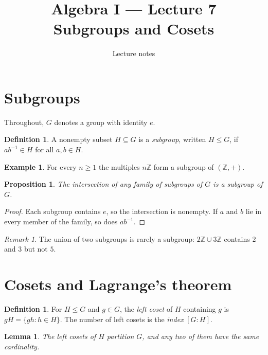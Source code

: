 \documentclass[11pt]{article}
\title{Algebra I --- Lecture 7\\ Subgroups and Cosets}
\author{Lecture notes}
\date{}
\newtheorem{lemma}[theorem]{Lemma}
\newtheorem{proposition}[theorem]{Proposition}
\theoremstyle{definition}
\newtheorem{definition}[theorem]{Definition}
\newtheorem{example}[theorem]{Example}
\theoremstyle{remark}
\newtheorem*{remark}{Remark}
\newcommand{\Z}{\mathbb{Z}}
\begin{document}
\maketitle

\section{Subgroups}

Throughout, $G$ denotes a group with identity $e$.

\begin{definition}
A nonempty subset $H \subseteq G$ is a \emph{subgroup}, written $H \le G$,
if $ab^{-1} \in H$ for all $a, b \in H$.
\end{definition}

\begin{example}
For every $n \ge 1$ the multiples $n\Z$ form a subgroup of $(\Z,+)$.
\end{example}

\begin{proposition}\label{prop:intersection}
The intersection of any family of subgroups of $G$ is a subgroup of $G$.
\end{proposition}

\begin{proof}
Each subgroup contains $e$, so the intersection is nonempty. If $a$ and $b$
lie in every member of the family, so does $ab^{-1}$.
\end{proof}

\begin{remark}
The union of two subgroups is rarely a subgroup: $2\Z \cup 3\Z$ contains $2$
and $3$ but not $5$.
\end{remark}

\section{Cosets and Lagrange's theorem}

\begin{definition}
For $H \le G$ and $g \in G$, the \emph{left coset} of $H$ containing $g$ is
$gH = \{ gh : h \in H \}$. The number of left cosets is the \emph{index}
$[G : H]$.
\end{definition}

\begin{lemma}\label{lem:partition}
The left cosets of $H$ partition $G$, and any two of them have the same
cardinality.
\end{lemma}
\end{document}
